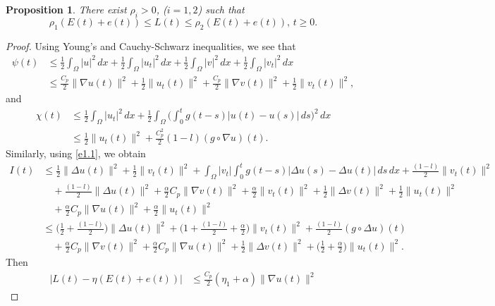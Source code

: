\documentclass[11pt]{article}
\numberwithin{equation}{section}
\newtheorem{proposition}[theorem]{Proposition}
\begin{document}
\begin{proposition} \label{prop11}
There exist \(\rho_i> 0 \), (\( i = 1, 2 \)) such that
\begin{equation}
\rho_1 (E(t)+e(t)) \leq L(t) \leq \rho_2 (E(t)+e(t)),\, t\geq 0. \label{e4.21}
\end{equation}
\end{proposition}

\begin{proof}
Using Young's and Cauchy-Schwarz inequalities, we see that
\begin{align*}
\psi(t)
& \leq \frac{1}{2}\int_{\Omega} |u|^2 \, dx+ \frac{1}{2}\int_{\Omega}|u_t|^2 \, dx
+\frac{1}{2}\int_{\Omega} |v|^2 \, dx+ \frac{1}{2}\int_{\Omega}|v_t|^2 \, dx \\
&\leq \frac{C_p}{2} \| \nabla u(t) \|^2+ \frac{1}{2} \| u_t(t) \|^2
 + \frac{C_p}{2} \| \nabla v(t) \|^2+ \frac{1}{2} \| v_t(t) \|^2,
\end{align*}
and
\begin{align*}
 \chi(t)
&\leq \frac{1}{2}\int_{\Omega}|u_t|^2 \, dx
 +\frac{1}{2} \int_{\Omega} \Big( \int_0^{t} g(t - s)|u(t) - u(s)| \, ds \Big)^2 \, dx
 \\
&\leq \frac{1}{2} \| u_t(t) \|^2+\frac{C_p^2 }{2} (1-l) (g \circ \nabla u)(t).
\end{align*}
Similarly, using \eqref{e1.1}, we obtain
\begin{align*}
I(t)
& \leq \frac{1}{2} \| \Delta u(t) \|^2+\frac{1}{2}\| v_t (t)\|^2
 +\int_{\Omega} | v_t| \int_0^t g(t-s) |\Delta u(s)- \Delta u(t)|\, ds\, dx
 +\frac{(1-l)}{2} \| v_t(t) \|^2\\
&\quad +\frac{(1-l)}{2} \| \Delta u (t)\|^2
 +\frac{\alpha}{2}C_p \| \nabla v(t) \|^2+\frac{\alpha}{2}\| v_t(t) \|^2
  +\frac{1}{2}\| \Delta v(t) \|^2+\frac{1}{2}\| u_t(t) \|^2\\
&\quad  +\frac{\alpha}{2}C_p \| \nabla u(t) \|^2+\frac{\alpha}{2} \| u_t(t) \|^2\\
& \leq \Big( \frac{1}{2}+\frac{(1-l)}{2}\Big)
 \| \Delta u(t)\|^2+\Big(1+\frac{(1-l)}{2}+\frac{\alpha}{2}\Big)
  \| v_t(t) \|^2 +\frac{(1-l)}{2} (g \circ \Delta u)(t)\\
&\quad + \frac{\alpha}{2}C_p \| \nabla v (t)\|^2
 +\frac{\alpha}{2}C_p \| \nabla u (t)\|^2+\frac{1}{2}\| \Delta v(t) \|^2
 +\Big( \frac{1}{2}+\frac{\alpha}{2} \Big) \| u_t (t)\|^2.
\end{align*}
Then
\begin{align*}
|L(t) - \eta (E(t)+ e(t))|
& \leq \frac{C_p }{2}( \eta_1 +\alpha )\| \nabla u(t) \|^2

\end{align*}
\end{proof}
\end{document}
